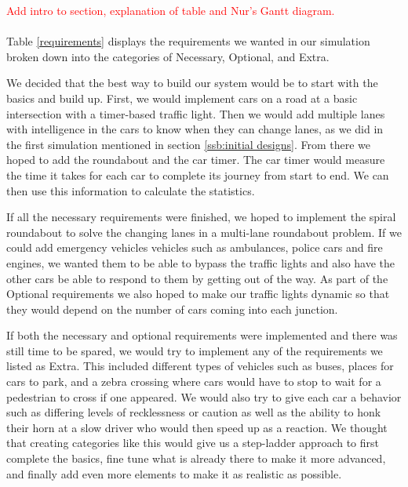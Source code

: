 \documentclass{article}
\begin{document}
	\textcolor{red}{Add intro to section, explanation of table and Nur's Gantt diagram.}\\\\
    
    
Table \ref{requirements} displays the requirements we wanted in our simulation broken down into the categories of Necessary, Optional, and Extra. 

We decided that the best way to build our system would be to start with the basics and build up. First, we would implement cars on a road at a basic intersection with a timer-based traffic light. Then we would add multiple lanes with intelligence in the cars to know when they can change lanes, as we did in the first simulation mentioned in section \ref{ssb:initial designs}. From there we hoped to add the roundabout and the car timer. The car timer would measure the time it takes for each car to complete its journey from start to end. We can then use this information to calculate the statistics. 

If all the necessary requirements were finished, we hoped to implement the spiral roundabout to solve the changing lanes in a multi-lane roundabout problem. If we could add emergency vehicles vehicles such as ambulances, police cars and fire engines, we wanted them to be able to bypass the traffic lights and also have the other cars be able to respond to them by getting out of the way. As part of the Optional requirements we also hoped to make our traffic lights dynamic so that they would depend on the number of cars coming into each junction.


If both the necessary and optional requirements were implemented and there was still time to be spared, we would try to implement any of the requirements we listed as Extra. This included different types of vehicles such as buses, places for cars to park, and a zebra crossing where cars would have to stop to wait for a pedestrian to cross if one appeared. We would also try to give each car a behavior such as differing levels of recklessness or caution as well as the ability to honk their horn at a slow driver who would then speed up as a reaction.
\newline\indent	We thought that creating categories like this would give us a step-ladder approach to first complete the basics, fine tune what is already there to make it more advanced, and finally add even more elements to make it as realistic as possible.

    
    
\end{document}
